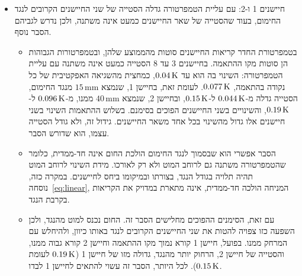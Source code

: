 \documentclass[10pt,a4paper]{article}
\newcommand{\U}[1]{\,\mathrm{#1}}
\begin{document}
\begin{itemize}
\begin{itemize}
    \item בנוסף, דפוס שמתחלף מחיישן לחיישן אינו מתאים לעקמומיות של הטמפרטורה לאורך המוט: לפי התיאוריה, הטמפרטורה צפויה להשתנות לאורך המוט בצורה חלקה, ולכן עקמומיות כזו הייתה יוצרת שארים המשתנים בהדרגה מחיישן לחיישן.
    \item אכן, בקריאה הראשונה של חלק ב׳, כשכל החיישנים עדיין בטמפרטורת החדר, קריאותיהם שונות מהממוצע שלהן בעד $\DOffsetMax\U{K}$, באותו דפוס סימנים של השארים, בכל שמונת החיישנים. התאמה זו מצביעה על כך שלפחות לחלק מהחיישנים יש הסטה קבועה בקריאה, ושהסטות אלו הן מקור עיקרי לדפוס החוזר.
    \item לכן, אף שהשארים אינם אקראיים, אין בהם עדות נגד ההנחה של נוסחה~\eqref{eq:linear}, שהטמפרטורה תלויה במיקום באופן לינארי: הדפוס שבהם נובע, לפחות בחלקו, מההסטות בקריאות החיישנים. מדידת ההסטות לפני הניסוי, כפי שמוצע בפסקת המגבלות בהמשך, תאפשר לבדוק זאת.
  \end{itemize}
  \item חיישנים 1 ו-2: עם עליית הטמפרטורה גדלה הסטייה של שני החיישנים הקרובים לנגד החימום, בעוד שהסטייה של שאר החיישנים כמעט אינה משתנה, ולכן נדרש לגביהם הסבר נוסף.
  \begin{itemize}\setlength{\itemsep}{0pt}\setlength{\parskip}{0pt}
    \item בטמפרטורת החדר קריאות החיישנים סוטות מהממוצע שלהן, ובטמפרטורות הגבוהות הן סוטות מקו ההתאמה. בחיישנים 3 עד 8 הסטייה כמעט אינה משתנה עם עליית הטמפרטורה: השינוי בה הוא עד $\DCorrRestMax\U{K}$, כמחצית מהשגיאה האפקטיבית של כל נקודה בהתאמה, $\BXErrK\U{K}$. לעומת זאת, בחיישן 1, שנמצא $15\U{mm}$ מנגד החימום, הסטייה גדלה מ-$\DOffOne\U{K}$ ל-$\DResOne\U{K}$, ובחיישן 2, שנמצא $40\U{mm}$ ממנו, מ-$\DOffTwo\U{K}$ ל-$\DResTwo\U{K}$, והשינויים בשני החיישנים הפוכים בסימנם. בשלוש ההתאמות השינוי בשני חיישנים אלו גדול מהשינוי בכל אחד משאר החיישנים. גידול זה, ולא גודל הסטייה עצמו, הוא שדורש הסבר.
    \item הסבר אפשרי הוא שבסמוך לנגד החימום הולכת החום אינה חד-ממדית, כלומר שהטמפרטורה משתנה גם לרוחב המוט ולא רק לאורכו. מידת השינוי לרוחב המוט תהיה תלויה בגודל הנגד, בצורתו ובמיקומו ביחס לחיישנים. במקרה כזה, נוסחה~\eqref{eq:linear}, המניחה הולכה חד-ממדית, אינה מתארת במדויק את הקריאות בקרבת הנגד.
    \item עם זאת, הסימנים ההפוכים מחלישים הסבר זה. החום נכנס למוט מהנגד, ולכן השפעה כזו צפויה להטות את שני החיישנים הקרובים לנגד באותו כיוון, ולהיחלש עם המרחק ממנו. בפועל, חיישן 1 קורא נמוך מקו ההתאמה וחיישן 2 קורא גבוה ממנו, והסטייה של חיישן 2, הרחוק יותר מהנגד, גדולה מזו של חיישן 1 ($\DResTwo\U{K}$ לעומת $\DResOne\U{K}$). לכל היותר, הסבר זה עשוי להתאים לחיישן 1 לבדו.

\end{itemize}
\end{itemize}
\end{document}
